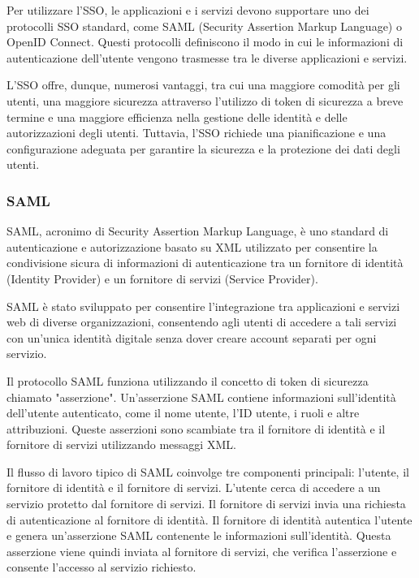 Per utilizzare l'SSO, le applicazioni e i servizi devono supportare uno dei protocolli SSO standard, come SAML (Security Assertion Markup Language) o OpenID Connect. Questi protocolli definiscono il modo in cui le informazioni di autenticazione dell'utente vengono trasmesse tra le diverse applicazioni e servizi.

L'SSO offre, dunque, numerosi vantaggi, tra cui una maggiore comodità per gli utenti, una maggiore sicurezza attraverso l'utilizzo di token di sicurezza a breve termine e una maggiore efficienza nella gestione delle identità e delle autorizzazioni degli utenti. Tuttavia, l'SSO richiede una pianificazione e una configurazione adeguata per garantire la sicurezza e la protezione dei dati degli utenti.

\subsubsection{SAML}

SAML, acronimo di Security Assertion Markup Language, è uno standard di autenticazione e autorizzazione basato su XML utilizzato per consentire la condivisione sicura di informazioni di autenticazione tra un fornitore di identità (Identity Provider) e un fornitore di servizi (Service Provider).

SAML è stato sviluppato per consentire l'integrazione tra applicazioni e servizi web di diverse organizzazioni, consentendo agli utenti di accedere a tali servizi con un'unica identità digitale senza dover creare account separati per ogni servizio.

Il protocollo SAML funziona utilizzando il concetto di token di sicurezza chiamato "asserzione". Un'asserzione SAML contiene informazioni sull'identità dell'utente autenticato, come il nome utente, l'ID utente, i ruoli e altre attribuzioni. Queste asserzioni sono scambiate tra il fornitore di identità e il fornitore di servizi utilizzando messaggi XML.

Il flusso di lavoro tipico di SAML coinvolge tre componenti principali: l'utente, il fornitore di identità e il fornitore di servizi. L'utente cerca di accedere a un servizio protetto dal fornitore di servizi. Il fornitore di servizi invia una richiesta di autenticazione al fornitore di identità. Il fornitore di identità autentica l'utente e genera un'asserzione SAML contenente le informazioni sull'identità. Questa asserzione viene quindi inviata al fornitore di servizi, che verifica l'asserzione e consente l'accesso al servizio richiesto.

